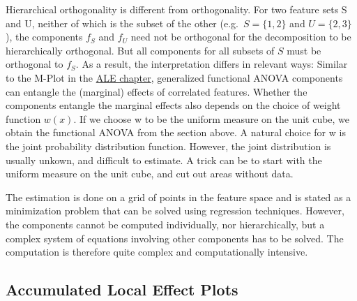 \documentclass[
  12pt,
]{krantz}
\begin{document}
Hierarchical orthogonality is different from orthogonality.
For two feature sets S and U, neither of which is the subset of the other (e.g.~\(S=\{1,2\}\) and \(U=\{2,3\}\)), the components \(f_S\) and \(f_U\) need not be orthogonal for the decomposition to be hierarchically orthogonal.
But all components for all subsets of \(S\) must be orthogonal to \(f_S\).
As a result, the interpretation differs in relevant ways:
Similar to the M-Plot in the \protect\hyperlink{ale}{ALE chapter}, generalized functional ANOVA components can entangle the (marginal) effects of correlated features.
Whether the components entangle the marginal effects also depends on the choice of weight function \(w(x)\).
If we choose w to be the uniform measure on the unit cube, we obtain the functional ANOVA from the section above.
A natural choice for w is the joint probability distribution function.
However, the joint distribution is usually unkown, and difficult to estimate.
A trick can be to start with the uniform measure on the unit cube, and cut out areas without data.

The estimation is done on a grid of points in the feature space and is stated as a minimization problem that can be solved using regression techniques.
However, the components cannot be computed individually, nor hierarchically, but a complex system of equations involving other components has to be solved.
The computation is therefore quite complex and computationally intensive.

\hypertarget{accumulated-local-effect-plots}{%
\subsection{Accumulated Local Effect Plots}\label{accumulated-local-effect-plots}}
\end{document}
